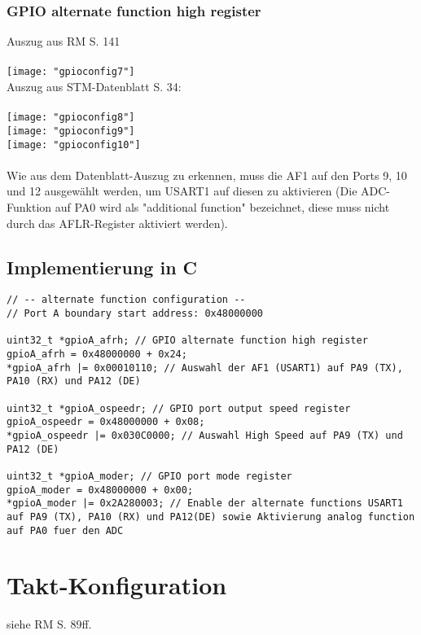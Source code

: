 \documentclass[11pt]{report}
\begin{document}
			\subsubsection{GPIO alternate function high register}
				Auszug aus RM S. 141\\
				\\\texttt{[image: "gpioconfig7"]}\\
				Auszug aus STM-Datenblatt S. 34:\\
				\\\texttt{[image: "gpioconfig8"]}\\
				\texttt{[image: "gpioconfig9"]}\\
				\texttt{[image: "gpioconfig10"]}\\
				\\Wie aus dem Datenblatt-Auszug zu erkennen, muss die AF1 auf den Ports 9, 10 und 12 ausgewählt werden, um USART1 auf diesen zu aktivieren (Die ADC-Funktion auf PA0 wird als "additional function" bezeichnet, diese muss nicht durch das AFLR-Register aktiviert werden).
		\subsection{Implementierung in C}
			\begin{lstlisting}
// -- alternate function configuration --
// Port A boundary start address: 0x48000000

uint32_t *gpioA_afrh; // GPIO alternate function high register
gpioA_afrh = 0x48000000 + 0x24;
*gpioA_afrh |= 0x00010110; // Auswahl der AF1 (USART1) auf PA9 (TX), PA10 (RX) und PA12 (DE)

uint32_t *gpioA_ospeedr; // GPIO port output speed register
gpioA_ospeedr = 0x48000000 + 0x08;
*gpioA_ospeedr |= 0x030C0000; // Auswahl High Speed auf PA9 (TX) und PA12 (DE)

uint32_t *gpioA_moder; // GPIO port mode register
gpioA_moder = 0x48000000 + 0x00;
*gpioA_moder |= 0x2A280003; // Enable der alternate functions USART1 auf PA9 (TX), PA10 (RX) und PA12(DE) sowie Aktivierung analog function auf PA0 fuer den ADC
			\end{lstlisting}
	\section{Takt-Konfiguration}
		\label{sec:clkconfig}
		siehe RM S. 89ff.\\
\end{document}
